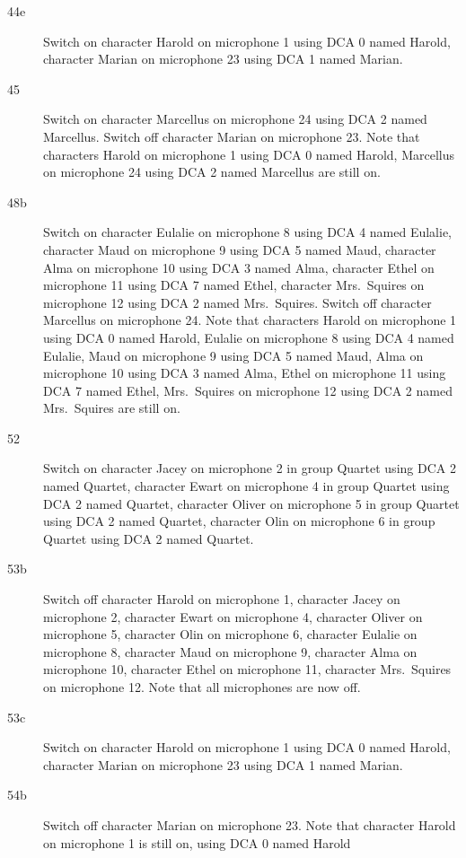 \begin{description}
\item[44e]
Switch on character Harold on microphone 1 using DCA 0 named Harold, character Marian on microphone 23 using DCA 1 named Marian. 

\item[45]
Switch on character Marcellus on microphone 24 using DCA 2 named Marcellus. Switch off character Marian on microphone 23. Note that characters Harold on microphone 1 using DCA 0 named Harold, Marcellus on microphone 24 using DCA 2 named Marcellus are still on.  

\item[48b]
Switch on character Eulalie on microphone 8 using DCA 4 named Eulalie, character Maud on microphone 9 using DCA 5 named Maud, character Alma on microphone 10 using DCA 3 named Alma, character Ethel on microphone 11 using DCA 7 named Ethel, character Mrs.~Squires on microphone 12 using DCA 2 named Mrs.~Squires. Switch off character Marcellus on microphone 24. Note that characters Harold on microphone 1 using DCA 0 named Harold, Eulalie on microphone 8 using DCA 4 named Eulalie, Maud on microphone 9 using DCA 5 named Maud, Alma on microphone 10 using DCA 3 named Alma, Ethel on microphone 11 using DCA 7 named Ethel, Mrs.~Squires on microphone 12 using DCA 2 named Mrs.~Squires are still on.  

\item[52]
Switch on character Jacey on microphone 2 in group Quartet using DCA 2 named Quartet, character Ewart on microphone 4 in group Quartet using DCA 2 named Quartet, character Oliver on microphone 5 in group Quartet using DCA 2 named Quartet, character Olin on microphone 6 in group Quartet using DCA 2 named Quartet. 

\item[53b]
Switch off character Harold on microphone 1, character Jacey on microphone 2, character Ewart on microphone 4, character Oliver on microphone 5, character Olin on microphone 6, character Eulalie on microphone 8, character Maud on microphone 9, character Alma on microphone 10, character Ethel on microphone 11, character Mrs.~Squires on microphone 12. Note that all microphones are now off.

\item[53c]
Switch on character Harold on microphone 1 using DCA 0 named Harold, character Marian on microphone 23 using DCA 1 named Marian. 

\item[54b]
Switch off character Marian on microphone 23. Note that character Harold on microphone 1 is still on, using DCA 0 named Harold


\end{description}
